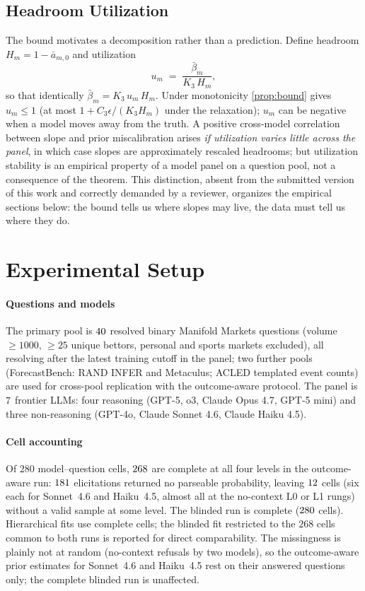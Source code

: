 \documentclass[conference]{IEEEtran}
\theoremstyle{plain}
\theoremstyle{remark}
\begin{document}
\subsection{Headroom Utilization}
\label{sec:util}

The bound motivates a decomposition rather than a prediction. Define headroom $H_m = 1 - \bar a_{m,0}$ and utilization
\[
  u_m \;=\; \frac{\bar\beta_m}{K_3\,H_m},
\]
so that identically $\bar\beta_m = K_3\,u_m\,H_m$. Under monotonicity \cref{prop:bound} gives $u_m \le 1$ (at most $1 + C_3\epsilon/(K_3 H_m)$ under the relaxation); $u_m$ can be negative when a model moves away from the truth. A positive cross-model correlation between slope and prior miscalibration arises \emph{if utilization varies little across the panel}, in which case slopes are approximately rescaled headrooms; but utilization stability is an empirical property of a model panel on a question pool, not a consequence of the theorem. This distinction, absent from the submitted version of this work and correctly demanded by a reviewer, organizes the empirical sections below: the bound tells us where slopes may live, the data must tell us where they do.

\section{Experimental Setup}
\label{sec:setup}

\paragraph{Questions and models}
The primary pool is $40$ resolved binary Manifold Markets questions (volume $\ge 1000$, $\ge 25$ unique bettors, personal and sports markets excluded), all resolving after the latest training cutoff in the panel; two further pools (ForecastBench: RAND INFER and Metaculus; ACLED templated event counts) are used for cross-pool replication with the outcome-aware protocol. The panel is $7$ frontier LLMs: four reasoning (GPT-5, o3, Claude Opus 4.7, GPT-5 mini) and three non-reasoning (GPT-4o, Claude Sonnet 4.6, Claude Haiku 4.5).

\paragraph{Cell accounting}
Of $280$ model--question cells, $268$ are complete at all four levels in the outcome-aware run: $181$ elicitations returned no parseable probability, leaving $12$ cells (six each for Sonnet~4.6 and Haiku~4.5, almost all at the no-context L0 or L1 rungs) without a valid sample at some level. The blinded run is complete ($280$ cells). Hierarchical fits use complete cells; the blinded fit restricted to the $268$ cells common to both runs is reported for direct comparability. The missingness is plainly not at random (no-context refusals by two models), so the outcome-aware prior estimates for Sonnet~4.6 and Haiku~4.5 rest on their answered questions only; the complete blinded run is unaffected.
\end{document}
